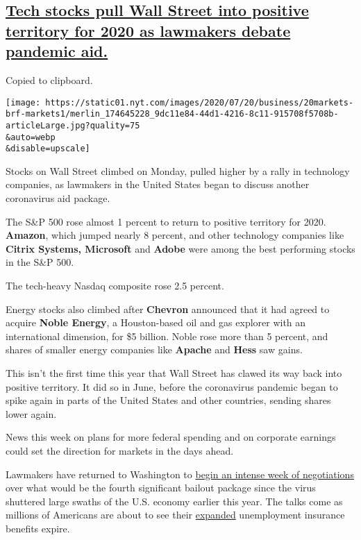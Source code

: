 \hypertarget{tech-stocks-pull-wall-street-into-positive-territory-for-2020-as-lawmakers-debate-pandemic-aid}{%
\subsection{\texorpdfstring{\protect\hyperlink{tech-stocks-pull-wall-street-into-positive-territory-for-2020-as-lawmakers-debate-pandemic-aid}{Tech
stocks pull Wall Street into positive territory for 2020 as lawmakers
debate pandemic
aid.}}{Tech stocks pull Wall Street into positive territory for 2020 as lawmakers debate pandemic aid.}}\label{tech-stocks-pull-wall-street-into-positive-territory-for-2020-as-lawmakers-debate-pandemic-aid}}

Copied to clipboard.

\texttt{[image: https://static01.nyt.com/images/2020/07/20/business/20markets-brf-markets1/merlin\_174645228\_9dc11e84-44d1-4216-8c11-915708f5708b-articleLarge.jpg?quality=75\\\&auto=webp\\\&disable=upscale]}

Stocks on Wall Street climbed on Monday, pulled higher by a rally in
technology companies, as lawmakers in the United States began to discuss
another coronavirus aid package.

The S\&P 500 rose almost 1 percent to return to positive territory for
2020. \textbf{Amazon}, which jumped nearly 8 percent, and other
technology companies like \textbf{Citrix Systems, Microsoft} and
\textbf{Adobe} were among the best performing stocks in the S\&P 500.

The tech-heavy Nasdaq composite rose 2.5 percent.

Energy stocks also climbed after \textbf{Chevron} announced that it had
agreed to acquire \textbf{Noble Energy}, a Houston-based oil and gas
explorer with an international dimension, for \$5 billion. Noble rose
more than 5 percent, and shares of smaller energy companies like
\textbf{Apache} and \textbf{Hess} saw gains.

This isn't the first time this year that Wall Street has clawed its way
back into positive territory. It did so in June, before the coronavirus
pandemic began to spike again in parts of the United States and other
countries, sending shares lower again.

News this week on plans for more federal spending and on corporate
earnings could set the direction for markets in the days ahead.

Lawmakers have returned to Washington to
\href{https://www.nytimes.com/2020/07/02/business/economy/congress-economy-coronavirus.html}{begin
an intense week of negotiations} over what would be the fourth
significant bailout package since the virus shuttered large swaths of
the U.S. economy earlier this year. The talks come as millions of
Americans are about to see their
\href{https://www.nytimes.com/interactive/2020/04/23/business/economy/unemployment-benefits-stimulus-coronavirus.html}{expanded}
unemployment insurance benefits expire.

